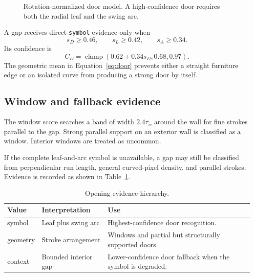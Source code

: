 \documentclass[11pt,a4paper]{article}
\newcommand{\code}[1]{\texttt{#1}}
\newcommand{\clamp}{\operatorname{clamp}}
\begin{document}
\begin{figure}[htbp]
\centering
{}
\caption{Rotation-normalized door model. A high-confidence door requires both the radial leaf and the swing arc.}
\label{fig:door}
\end{figure}

A gap receives direct \code{symbol} evidence only when
\begin{equation}
s_D\geq0.46,\qquad s_L\geq0.42,\qquad s_A\geq0.34.
\end{equation}
Its confidence is
\begin{equation}
C_D=\clamp(0.62+0.34s_D,0.68,0.97).
\end{equation}
The geometric mean in Equation~\eqref{eq:door} prevents either a straight furniture edge or an isolated curve from producing a strong door by itself.

\subsection{Window and fallback evidence}

The window score searches a band of width $2.4\tau_w$ around the wall for fine strokes parallel to the gap. Strong parallel support on an exterior wall is classified as a window. Interior windows are treated as uncommon.

If the complete leaf-and-arc symbol is unavailable, a gap may still be classified from perpendicular run length, general curved-pixel density, and parallel strokes. Evidence is recorded as shown in Table~\ref{tab:evidence}.

\begin{table}[htbp]
\centering
\caption{Opening evidence hierarchy.}
\label{tab:evidence}
\begin{tabularx}{\textwidth}{@{}>{\ttfamily}p{23mm}p{38mm}X@{}}
\toprule
Value & Interpretation & Use \\
\midrule
symbol & Leaf plus swing arc & Highest-confidence door recognition. \\
geometry & Stroke arrangement & Windows and partial but structurally supported doors. \\
context & Bounded interior gap & Lower-confidence door fallback when the symbol is degraded. \\
\bottomrule
\end{tabularx}
\end{table}
\end{document}
